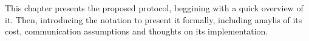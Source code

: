 \begin{mychapterabstract}
    This chapter presents the proposed protocol, beggining with a quick
    overview of it. Then, introducing the notation to present it formally,
    including anaylis of its cost, communication assumptions and thoughts on
    its implementation.
\end{mychapterabstract}
